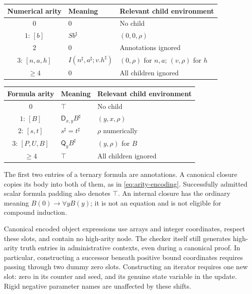 \documentclass[11pt,letterpaper]{article}
\theoremstyle{definition}
\newcommand{\D}{\mathsf D}
\newcommand{\Q}{\mathsf Q}
\begin{document}
\begin{center}
\begin{tabular}{cll}
\toprule
Numerical arity & Meaning & Relevant child environment\\
\midrule
$0$ & $0$ & No child\\
$1$: $[b]$ & $Sb^\sharp$ & $(0,0,\rho)$\\
$2$ & $0$ & Annotations ignored\\
$3$: $[n,a,h]$ & $I(n^\sharp,a^\sharp;v.h^\sharp)$ & $(0,\rho)$ for $n,a$; $(v,\rho)$ for $h$\\
$\geq4$ & $0$ & All children ignored\\
\bottomrule
\end{tabular}
\end{center}

\begin{center}
\begin{tabular}{cll}
\toprule
Formula arity & Meaning & Relevant child environment\\
\midrule
$0$ & $\top$ & No child\\
$1$: $[B]$ & $\D_{x,y}B^\sharp$ & $(y,x,\rho)$\\
$2$: $[s,t]$ & $s^\sharp=t^\sharp$ & $\rho$ numerically\\
$3$: $[P,U,B]$ & $\Q_yB^\sharp$ & $(y,\rho)$ for $B$\\
$\geq4$ & $\top$ & All children ignored\\
\bottomrule
\end{tabular}
\end{center}

The first two entries of a ternary formula are annotations.  A canonical
closure copies its body into both of them, as in
\eqref{eq:arity-encoding}.  Successfully admitted scalar formula padding
also denotes $\top$.  An internal closure has the ordinary meaning
$B(0)\to\forall yB(y)$; it is not an equation and is not eligible for
compound induction.

Canonical encoded object expressions use arrays and integer coordinates,
respect these slots, and contain no high-arity node.  The checker itself
still generates high-arity truth entries in administrative contexts,
even during a canonical proof.  In particular, constructing a
successor beneath positive bound coordinates requires passing through
two dummy zero slots.  Constructing an iterator requires one new slot:
zero in its counter and seed, and its genuine state variable in the
update.  Rigid negative parameter names are unaffected by these shifts.
\end{document}
